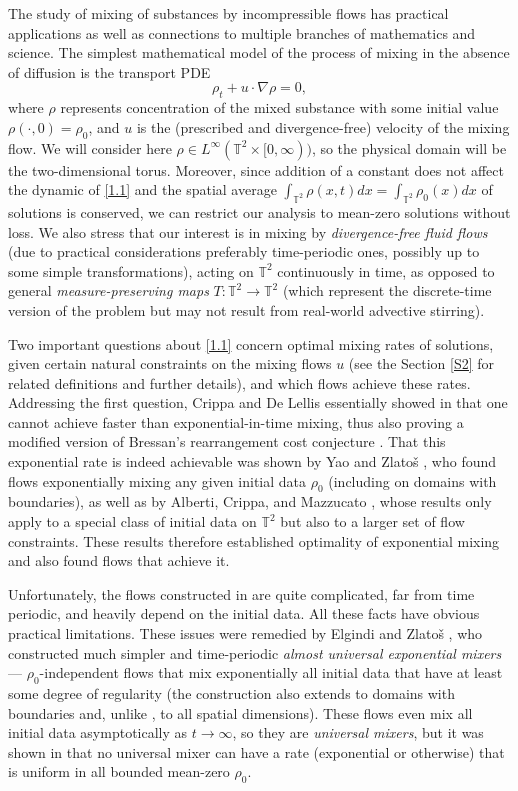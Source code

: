 \documentclass[12pt]{article}
\numberwithin{figure}{section}
\numberwithin{equation}{section}
\newcommand{\beq}{\begin{equation}}
\newcommand{\eeq}{\end{equation}}
\newcommand{\lb}{\label}
\newcommand{\bbT}{{\mathbb{T}}}
\begin{document}
The study of mixing of substances by incompressible flows has practical applications
as well as connections to multiple branches of  mathematics and science.  The simplest mathematical model of the process of mixing in the absence of diffusion is the transport PDE
\beq \lb{1.1}
\rho_t+u\cdot\nabla\rho=0,
\eeq
where $\rho$ represents concentration of the mixed substance with some initial value $\rho(\cdot,0)=\rho_0$, and $u$ is the (prescribed and divergence-free) velocity of the mixing flow.  We will consider here $\rho\in L^\infty(\bbT^2\times[0,\infty))$, so the physical domain will be the two-dimensional torus.  Moreover,  since addition of a constant does not affect the dynamic of \eqref{1.1} and the spatial average $\int_{\bbT^2} \rho(x,t)dx= \int_{\bbT^2} \rho_0(x)dx$ of solutions is conserved, we can restrict our analysis to mean-zero solutions without loss.  We also stress that our interest is in mixing  by {\it divergence-free fluid flows} (due to practical considerations preferably time-periodic ones, possibly up to some simple transformations), acting on $\bbT^2$ continuously in time, as opposed to general {\it measure-preserving maps} $T:\bbT^2\to\bbT^2$ (which represent the discrete-time version of the problem but may not result from real-world advective stirring).

Two important questions about \eqref{1.1} concern optimal mixing rates of solutions, given certain natural constraints on the mixing flows $u$ (see the Section \ref{S2} for related definitions and further details), and which flows achieve these rates.   Addressing the first question, Crippa and De Lellis essentially showed in \cite{CL} that one cannot achieve faster than exponential-in-time mixing, thus also proving a modified version of Bressan's rearrangement cost  conjecture \cite{Bressan, B2}.  That this exponential rate is indeed achievable was shown by Yao and Zlato\v s \cite{YaoZla}, who found flows exponentially mixing any given initial data $\rho_0$ (including on domains with boundaries), as well as by Alberti, Crippa, and Mazzucato \cite{ACM2}, whose results only apply to a special class of initial data on $\bbT^2$ but also to a larger set of flow constraints.  These results therefore established optimality of exponential mixing and also found flows that achieve it.

Unfortunately, the flows constructed in \cite{YaoZla, ACM2} are quite complicated, far from time periodic, and heavily depend on the initial data.  All these facts have obvious practical limitations.  These issues were remedied by Elgindi and Zlato\v s \cite{ElgZla}, who constructed much simpler and time-periodic {\it almost universal exponential mixers} --- $\rho_0$-independent flows that mix exponentially all initial data that have at least some degree of regularity (the construction also extends to domains with boundaries and, unlike \cite{YaoZla, ACM2}, to all spatial dimensions).  These flows even mix all initial data asymptotically as $t\to\infty$, so they are {\it universal mixers}, but it was shown in \cite{ElgZla} that no universal mixer can have a  rate (exponential or otherwise) that is uniform in all bounded mean-zero $\rho_0$.
\end{document}
